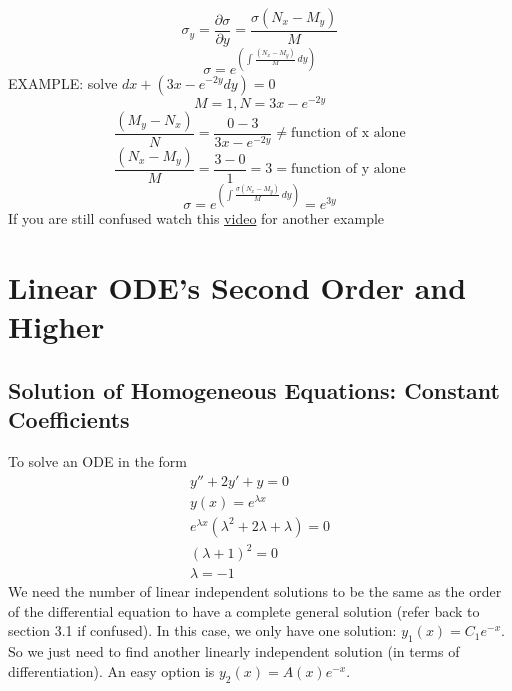 \documentclass{report}
\begin{document}
        \begin{equation}
            \sigma_y  = 
            \frac{\partial \sigma}{\partial y} = 
            \frac{\sigma(N_x - M_y)}{M} 
        \end{equation}
        \begin{equation}
            \sigma = e^{\textstyle  (\int \frac{(N_x - M_y)}{M}  \,dy)}
        \end{equation}
        EXAMPLE: solve $dx + (3x-e^{-2y}dy) = 0$
        \begin{equation}
            M = 1, N = 3x-e^{-2y}
        \end{equation}
        \begin{equation}
            \frac{(M_y - N_x)}{N} = \frac{0 - 3}{3x-e^{-2y}} \neq \text{function of x alone}
        \end{equation}
        \begin{equation}
            \frac{(N_x - M_y)}{M} = \frac{3 - 0}{1} = 3 = \text{function of y alone}
        \end{equation}
        \begin{equation}
            \sigma = 
            e^{\textstyle  (\int \frac{\sigma(N_x - M_y)}{M}  \,dy)} = 
            e^{3y}
        \end{equation}
        If you are still confused watch this \href{https://www.youtube.com/watch?v=UXMTYfQfU-c}{video} for another example
        
            
    
        
        


\newpage
\newpage  
 

\chapter{Linear ODE's Second Order and Higher}  
    \setcounter{section}{3}
    \section{Solution of Homogeneous Equations: Constant Coefficients}
        To solve an ODE in the form
        \begin{align}
            y''+2y'+y = 0 \\
            y(x) = e^{\lambda x} \\
            e^{\lambda x} (\lambda^{2} + 2\lambda + \lambda) = 0 \\
            (\lambda + 1)^{2} = 0 \\
            \lambda = -1
        \end{align}
        We need the number of linear independent solutions to be the same as the order of the differential equation to have a complete general solution (refer back to section 3.1 if confused). In this case, we only have one solution: $y_1(x) = C_1e^{-x}$. So we just need to find another linearly independent  solution (in terms of differentiation). An easy option is $y_2(x) = A(x)e^{-x}$. 
\end{document}
